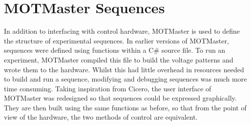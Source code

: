 \section{MOTMaster Sequences}\label{sec:mm_sequences}
In addition to interfacing with control hardware, MOTMaster is used to define
the structure of experimental sequences. In earlier versions of MOTMaster,
sequences were defined using functions within a C\# source file. To run an
experiment, MOTMaster compiled this file to build the voltage patterns and
wrote them to the hardware. Whilst this had little overhead in resources
needed to build and run a sequence, modifying and debugging sequences was
much more time consuming. Taking inspiration from Cicero, the user interface
of MOTMaster was redesigned so that sequences could be expressed graphically.
They are then built using the same functions as before, so that from the
point of view of the hardware, the two methods of control are equivalent. 

